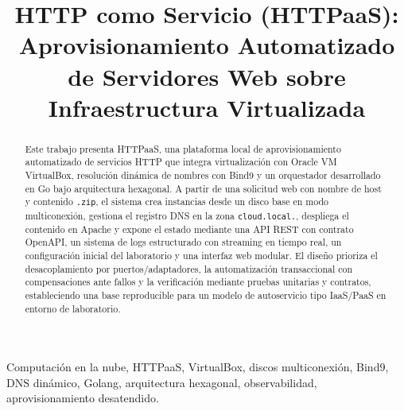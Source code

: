 \documentclass[journal]{IEEEtran}
\title{HTTP como Servicio (HTTPaaS): Aprovisionamiento Automatizado de Servidores Web sobre Infraestructura Virtualizada}
\author{
  \IEEEauthorblockN{Jorge Acosta \hspace{0.3cm} Andrey Tombe\\
  \vspace{0.5cm}
  {\normalsize Universidad del Quindío}\\
  {\normalsize Facultad de Ingeniería}\\
  {\normalsize Ingeniería de Sistemas y Computación}\\
  {\normalsize Computación en la Nube}\\
  {\normalsize Noviembre del 2026}}
}
\begin{document}
\maketitle

\begin{abstract}
Este trabajo presenta HTTPaaS, una plataforma local de aprovisionamiento automatizado de servicios HTTP que integra virtualización con Oracle VM VirtualBox, resolución dinámica de nombres con Bind9 y un orquestador desarrollado en Go bajo arquitectura hexagonal. A partir de una solicitud web con nombre de host y contenido \texttt{.zip}, el sistema crea instancias desde un disco base en modo multiconexión, gestiona el registro DNS en la zona \texttt{cloud.local.}, despliega el contenido en Apache y expone el estado mediante una API REST con contrato OpenAPI, un sistema de logs estructurado con streaming en tiempo real, un configuración inicial del laboratorio y una interfaz web modular. El diseño prioriza el desacoplamiento por puertos/adaptadores, la automatización transaccional con compensaciones ante fallos y la verificación mediante pruebas unitarias y contratos, estableciendo una base reproducible para un modelo de autoservicio tipo IaaS/PaaS en entorno de laboratorio.
\end{abstract}

\begin{IEEEkeywords}
Computación en la nube, HTTPaaS, VirtualBox, discos multiconexión, Bind9, DNS dinámico, Golang, arquitectura hexagonal, observabilidad, aprovisionamiento desatendido.
\end{IEEEkeywords}








\printbibliography
\end{document}
